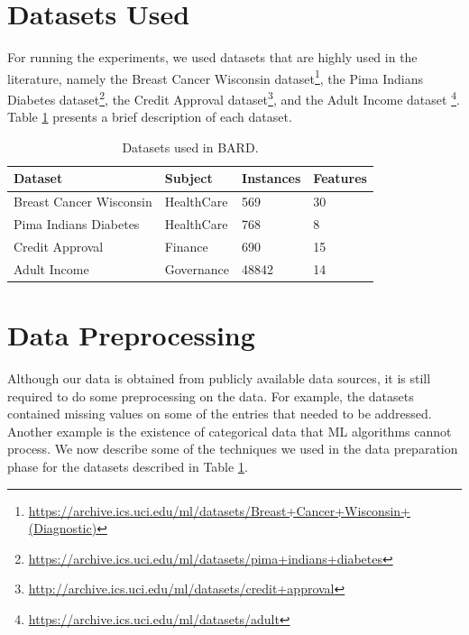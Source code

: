 



\section{Datasets Used}
\label{sec:DatasetsImplementation}

For running the experiments, we used datasets that are highly used in the literature, namely the Breast Cancer Wisconsin dataset\footnote{\url{https://archive.ics.uci.edu/ml/datasets/Breast+Cancer+Wisconsin+(Diagnostic)}}, the Pima Indians Diabetes dataset\footnote{\url{https://archive.ics.uci.edu/ml/datasets/pima+indians+diabetes}}, the Credit Approval dataset\footnote{\url{http://archive.ics.uci.edu/ml/datasets/credit+approval}}, and the Adult Income dataset \footnote{\url{https://archive.ics.uci.edu/ml/datasets/adult}}. Table \ref{table:datasets} presents a brief description of each dataset.

\begin{table}[H]
\centering
\caption{Datasets used in \ac{BARD}.}
\label{table:datasets}
\begin{tabular}{|l|l|l|l|}
\hline
\textbf{Dataset} & \textbf{Subject} & \textbf{Instances} & \textbf{Features} \\ \hline
 Breast Cancer Wisconsin  &  HealthCare  & 569    & 30       \\ \hline
 Pima Indians Diabetes    &  HealthCare  & 768    &  8       \\ \hline
 Credit Approval          &  Finance     & 690    & 15       \\ \hline
 Adult Income             &  Governance  & 48842  & 14       \\ \hline 
\end{tabular}
\end{table}



\section{Data Preprocessing}
\label{sec:DataPreProcessingImplementation}

Although our data is obtained from publicly available data sources, it is still required to do some preprocessing on the data.
For example, the datasets contained missing values on some of the entries that needed to be addressed. Another example is the existence of categorical data that \ac{ML} algorithms cannot process. We now describe some of the techniques we used in the data preparation phase for the datasets described in Table \ref{table:datasets}.

